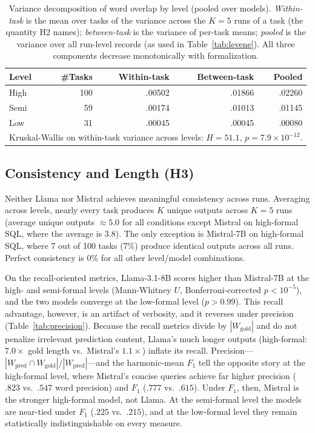 \documentclass[runningheads]{llncs}
\begin{document}
\begin{table}[ht]
\centering
\caption{Variance decomposition of word overlap by level (pooled over models). \emph{Within-task} is the mean over tasks of the variance across the $K\!=\!5$ runs of a task (the quantity H2 names); \emph{between-task} is the variance of per-task means; \emph{pooled} is the variance over all run-level records (as used in Table~\ref{tab:levene}). All three components decrease monotonically with formalization.}
\label{tab:variance-decomp}
\setlength{\tabcolsep}{7pt}
\begin{tabular}{lrrrr}
\toprule
Level & \#Tasks & Within-task & Between-task & Pooled \\
\midrule
High & 100 & .00502 & .01866 & .02260 \\
Semi &  59 & .00174 & .01013 & .01145 \\
Low  &  31 & .00045 & .00045 & .00080 \\
\bottomrule
\multicolumn{5}{l}{\scriptsize Kruskal-Wallis on within-task variance across levels: $H\!=\!51.1$, $p\!=\!7.9\times10^{-12}$.}
\end{tabular}
\end{table}

\subsection{Consistency and Length (H3)}
\label{sec:consistency}

Neither Llama nor Mistral achieves meaningful consistency across runs. Averaging across levels, nearly every task produces $K$ unique outputs across $K\!=\!5$ runs (average unique outputs $\approx 5.0$ for all conditions except Mistral on high-formal SQL, where the average is 3.8). The only exception is Mistral-7B on high-formal SQL, where 7 out of 100 tasks (7\%) produce identical outputs across all runs. Perfect consistency is 0\% for all other level/model combinations.

On the recall-oriented metrics, Llama-3.1-8B scores higher than Mistral-7B at the high- and semi-formal levels (Mann-Whitney $U$, Bonferroni-corrected $p < 10^{-5}$), and the two models converge at the low-formal level ($p > 0.99$). This recall advantage, however, is an artifact of verbosity, and it reverses under precision (Table~\ref{tab:precision}). Because the recall metrics divide by $|W_{\text{gold}}|$ and do not penalize irrelevant prediction content, Llama's much longer outputs (high-formal: $7.0\times$ gold length vs.\ Mistral's $1.1\times$) inflate its recall. Precision---$|W_{\text{pred}} \cap W_{\text{gold}}| / |W_{\text{pred}}|$---and the harmonic-mean $F_1$ tell the opposite story at the high-formal level, where Mistral's concise queries achieve far higher precision ($.823$ vs.\ $.547$ word precision) and $F_1$ ($.777$ vs.\ $.615$). Under $F_1$, then, Mistral is the stronger high-formal model, not Llama. At the semi-formal level the models are near-tied under $F_1$ ($.225$ vs.\ $.215$), and at the low-formal level they remain statistically indistinguishable on every measure.
\end{document}
